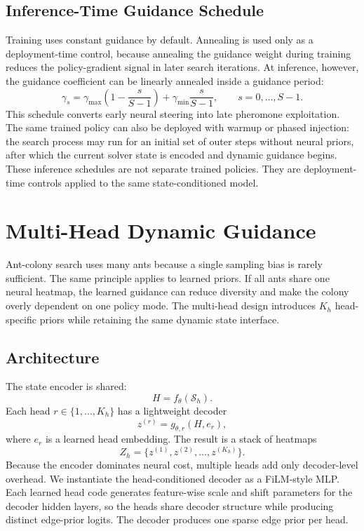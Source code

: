 \documentclass[11pt]{article}
\begin{document}
\subsection{Inference-Time Guidance Schedule}
\label{sec:inference-schedule}

Training uses constant guidance by default.
Annealing is used only as a deployment-time control, because annealing the guidance weight during training reduces the policy-gradient signal in later search iterations.
At inference, however, the guidance coefficient can be linearly annealed inside a guidance period:
\begin{equation}
\gamma_s
=
\gamma_{\max}
\left(1-\frac{s}{S-1}\right)
+
\gamma_{\min}
\frac{s}{S-1},
\qquad s=0,\dots,S-1.
\end{equation}
This schedule converts early neural steering into late pheromone exploitation.
The same trained policy can also be deployed with warmup or phased injection: the search process may run for an initial set of outer steps without neural priors, after which the current solver state is encoded and dynamic guidance begins.
These inference schedules are not separate trained policies.
They are deployment-time controls applied to the same state-conditioned model.

\section{Multi-Head Dynamic Guidance}
\label{sec:multihead}

Ant-colony search uses many ants because a single sampling bias is rarely sufficient.
The same principle applies to learned priors.
If all ants share one neural heatmap, the learned guidance can reduce diversity and make the colony overly dependent on one policy mode.
The multi-head design introduces $K_h$ head-specific priors while retaining the same dynamic state interface.

\subsection{Architecture}
\label{sec:mh-architecture}

The state encoder is shared:
\begin{equation}
H = f_\theta(\mathcal{S}_h).
\end{equation}
Each head $r \in \{1,\dots,K_h\}$ has a lightweight decoder
\begin{equation}
z^{(r)} = g_{\theta,r}(H, e_r),
\end{equation}
where $e_r$ is a learned head embedding.
The result is a stack of heatmaps
\begin{equation}
Z_h = \{z^{(1)}, z^{(2)}, \dots, z^{(K_h)}\}.
\end{equation}
Because the encoder dominates neural cost, multiple heads add only decoder-level overhead.
We instantiate the head-conditioned decoder as a FiLM-style MLP.
Each learned head code generates feature-wise scale and shift parameters for the decoder hidden layers, so the heads share decoder structure while producing distinct edge-prior logits.
The decoder produces one sparse edge prior per head.
\end{document}

